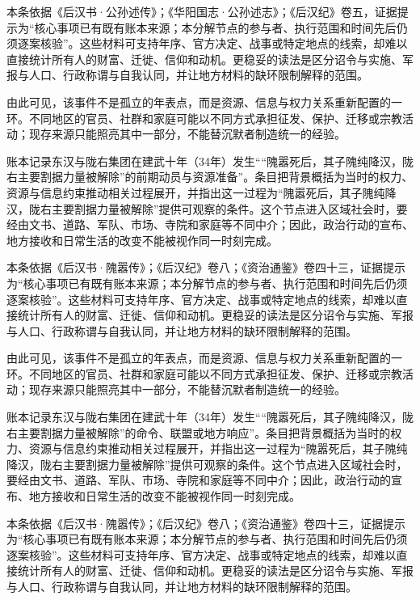 本条依据《后汉书·公孙述传》；《华阳国志·公孙述志》；《后汉纪》卷五，证据提示为“核心事项已有既有账本来源；本分解节点的参与者、执行范围和时间先后仍须逐案核验”。这些材料可支持年序、官方决定、战事或特定地点的线索，却难以直接统计所有人的财富、迁徙、信仰和动机。更稳妥的读法是区分诏令与实施、军报与人口、行政称谓与自我认同，并让地方材料的缺环限制解释的范围。

由此可见，该事件不是孤立的年表点，而是资源、信息与权力关系重新配置的一环。不同地区的官员、社群和家庭可能以不同方式承担征发、保护、迁移或宗教活动；现存来源只能照亮其中一部分，不能替沉默者制造统一的经验。

账本记录东汉与陇右集团在建武十年（34年）发生““隗嚣死后，其子隗纯降汉，陇右主要割据力量被解除”的前期动员与资源准备”。条目把背景概括为当时的权力、资源与信息约束推动相关过程展开，并指出这一过程为“隗嚣死后，其子隗纯降汉，陇右主要割据力量被解除”提供可观察的条件。这个节点进入区域社会时，要经由文书、道路、军队、市场、寺院和家庭等不同中介；因此，政治行动的宣布、地方接收和日常生活的改变不能被视作同一时刻完成。

本条依据《后汉书·隗嚣传》；《后汉纪》卷八；《资治通鉴》卷四十三，证据提示为“核心事项已有既有账本来源；本分解节点的参与者、执行范围和时间先后仍须逐案核验”。这些材料可支持年序、官方决定、战事或特定地点的线索，却难以直接统计所有人的财富、迁徙、信仰和动机。更稳妥的读法是区分诏令与实施、军报与人口、行政称谓与自我认同，并让地方材料的缺环限制解释的范围。

由此可见，该事件不是孤立的年表点，而是资源、信息与权力关系重新配置的一环。不同地区的官员、社群和家庭可能以不同方式承担征发、保护、迁移或宗教活动；现存来源只能照亮其中一部分，不能替沉默者制造统一的经验。

账本记录东汉与陇右集团在建武十年（34年）发生““隗嚣死后，其子隗纯降汉，陇右主要割据力量被解除”的命令、联盟或地方响应”。条目把背景概括为当时的权力、资源与信息约束推动相关过程展开，并指出这一过程为“隗嚣死后，其子隗纯降汉，陇右主要割据力量被解除”提供可观察的条件。这个节点进入区域社会时，要经由文书、道路、军队、市场、寺院和家庭等不同中介；因此，政治行动的宣布、地方接收和日常生活的改变不能被视作同一时刻完成。

本条依据《后汉书·隗嚣传》；《后汉纪》卷八；《资治通鉴》卷四十三，证据提示为“核心事项已有既有账本来源；本分解节点的参与者、执行范围和时间先后仍须逐案核验”。这些材料可支持年序、官方决定、战事或特定地点的线索，却难以直接统计所有人的财富、迁徙、信仰和动机。更稳妥的读法是区分诏令与实施、军报与人口、行政称谓与自我认同，并让地方材料的缺环限制解释的范围。

